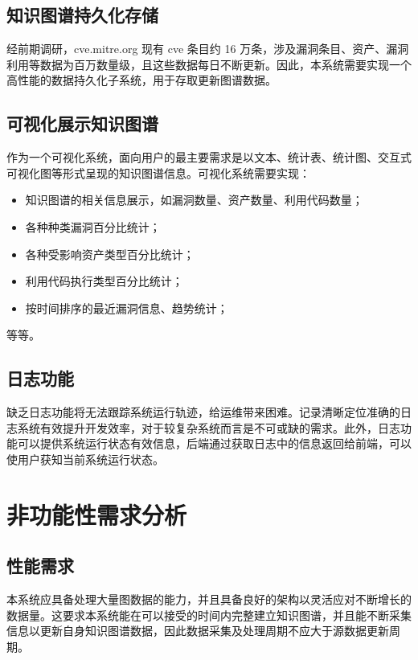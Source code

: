 \documentclass[a4paper,AutoFakeBold,oneside,12pt]{book}
\begin{document}
\subsection{知识图谱持久化存储}

经前期调研，cve.mitre.org 现有 cve 条目约 16 万条，涉及漏洞条目、资产、漏洞利用等数据为百万数量级，且这些数据每日不断更新。因此，本系统需要实现一个高性能的数据持久化子系统，用于存取更新图谱数据。

\subsection{可视化展示知识图谱}

作为一个可视化系统，面向用户的最主要需求是以文本、统计表、统计图、交互式可视化图等形式呈现的知识图谱信息。可视化系统需要实现：
\begin{itemize}
	\item 知识图谱的相关信息展示，如漏洞数量、资产数量、利用代码数量；
	\item 各种种类漏洞百分比统计；
	\item 各种受影响资产类型百分比统计；
	\item 利用代码执行类型百分比统计；
	\item 按时间排序的最近漏洞信息、趋势统计；
\end{itemize}
等等。

\subsection{日志功能}

缺乏日志功能将无法跟踪系统运行轨迹，给运维带来困难。记录清晰定位准确的日志系统有效提升开发效率，对于较复杂系统而言是不可或缺的需求。此外，日志功能可以提供系统运行状态有效信息，后端通过获取日志中的信息返回给前端，可以使用户获知当前系统运行状态。

\section{非功能性需求分析}

\subsection{性能需求}

本系统应具备处理大量图数据的能力，并且具备良好的架构以灵活应对不断增长的数据量。这要求本系统能在可以接受的时间内完整建立知识图谱，并且能不断采集信息以更新自身知识图谱数据，因此数据采集及处理周期不应大于源数据更新周期。
\end{document}
